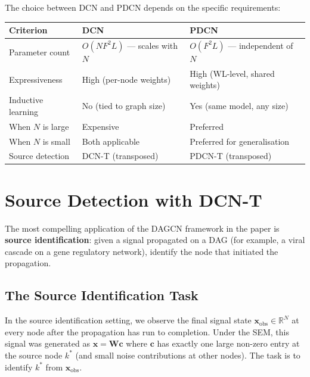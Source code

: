 The choice between DCN and PDCN depends on the specific requirements:

\begin{center}
\begin{tabular}{lll}
\toprule
\textbf{Criterion} & \textbf{DCN} & \textbf{PDCN} \\
\midrule
Parameter count & $O(NF^2L)$ --- scales with $N$ & $O(F^2L)$ --- independent of $N$ \\
Expressiveness & High (per-node weights) & High (WL-level, shared weights) \\
Inductive learning & No (tied to graph size) & Yes (same model, any size) \\
When $N$ is large & Expensive & Preferred \\
When $N$ is small & Both applicable & Preferred for generalisation \\
Source detection & DCN-T (transposed) & PDCN-T (transposed) \\
\bottomrule
\end{tabular}
\end{center}

\section{Source Detection with DCN-T}
\label{sec:dagcn_source}

The most compelling application of the DAGCN framework in the paper is
\textbf{source identification}: given a signal propagated on a DAG (for example,
a viral cascade on a gene regulatory network), identify the node that initiated
the propagation.

\subsection{The Source Identification Task}

In the source identification setting, we observe the final signal state
$\mathbf{x}_{\text{obs}} \in \mathbb{R}^N$ at every node after the propagation
has run to completion. Under the SEM, this signal was generated as $\mathbf{x}
= \mathbf{W}\mathbf{c}$ where $\mathbf{c}$ has exactly one large non-zero entry
at the source node $k^*$ (and small noise contributions at other nodes). The
task is to identify $k^*$ from $\mathbf{x}_{\text{obs}}$.


